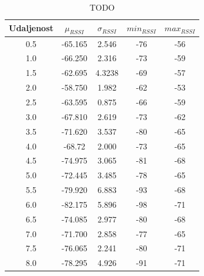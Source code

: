 \begin{table}
	\centering
	\caption{TODO}
	\label{tbl:indoorKontaktMaxTx}
	\begin{tabular}{ccccc}
	\hline 
	Udaljenost & $\mu_{RSSI}$ & $\sigma_{RSSI}$ & $min_{RSSI}$ & $max_{RSSI}$ \\ 
	\hline 
	0.5 & -65.165 & 2.546 & -76 & -56 \\
	1.0 & -66.250 & 2.316 & -73 & -59 \\
	1.5 & -62.695 & 4.3238 & -69 & -57 \\
	2.0 & -58.750 & 1.982 & -62 & -53 \\
	2.5 & -63.595 & 0.875 & -66 & -59 \\
	3.0 & -67.810 & 2.619 & -73 & -62 \\
	3.5 & -71.620 & 3.537 & -80 & -65 \\
	4.0 & -68.72 & 2.000 & -73 & -65 \\
	4.5 & -74.975 & 3.065 & -81 & -68 \\
	5.0 & -72.445 & 3.485 & -78 & -65 \\
	5.5 & -79.920 & 6.883 & -93 & -68 \\
	6.0 & -82.175 & 5.896 & -98 & -71 \\
	6.5 & -74.085 & 2.977 & -80 & -68 \\
	7.0 & -71.700 & 2.858 & -77 & -65 \\
	7.5 & -76.065 & 2.241 & -80 & -71 \\
	8.0 & -78.295 & 4.926 & -91 & -71 \\
	\hline
	\end{tabular}
\end{table}



